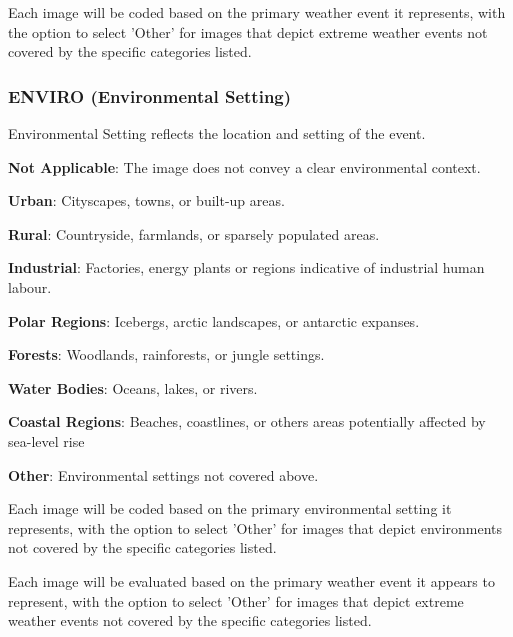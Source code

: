 Each image will be coded based on the primary weather event it represents, with the option to select 'Other' for images that depict extreme weather events not covered by the specific categories listed.

\subsubsection*{ENVIRO (Environmental Setting)}
\label{subsubsec:environmental-setting}
Environmental Setting reflects the location and setting of the event.
\begin{description}[leftmargin=2.5cm, style=multiline, labelwidth=1.5cm]
\item[0] \textbf{Not Applicable}: The image does not convey a clear environmental context.
\item[1] \textbf{Urban}: Cityscapes, towns, or built-up areas.
\item[2] \textbf{Rural}: Countryside, farmlands, or sparsely populated areas.
\item[3] \textbf{Industrial}: Factories, energy plants or regions indicative of industrial human labour.
\item[4] \textbf{Polar Regions}: Icebergs, arctic landscapes, or antarctic expanses.
\item[5] \textbf{Forests}: Woodlands, rainforests, or jungle settings.
\item[6] \textbf{Water Bodies}: Oceans, lakes, or rivers.
\item[7] \textbf{Coastal Regions}: Beaches, coastlines, or others areas potentially affected by sea-level rise
\item[8] \textbf{Other}: Environmental settings not covered above.
\end{description}

Each image will be coded based on the primary environmental setting it represents, with the option to select 'Other' for images that depict environments not covered by the specific categories listed.

\noindent
Each image will be evaluated based on the primary weather event it appears to represent, with the option to select 'Other' for images that depict extreme weather events not covered by the specific categories listed.

